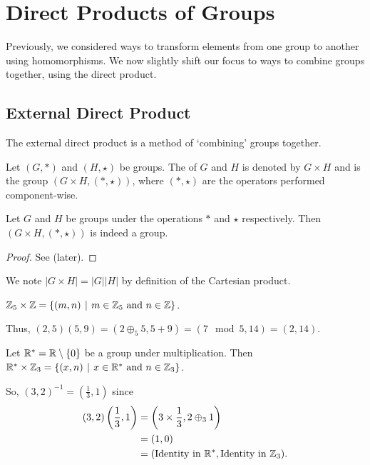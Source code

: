 \chapter{Direct Products of Groups}
Previously, we considered ways to transform elements from one group to another using homomorphisms. We now slightly shift our focus to ways to combine groups together, using the direct product.

\section{External Direct Product}
The external direct product is a method of `combining' groups together.

\begin{definition}
    Let $(G, \ast)$ and $(H, \star)$ be groups. The  of $G$ and $H$ is denoted by $G\times H$ and is the group $(G\times H, (\ast, \star))$, where $(\ast, \star)$ are the operators performed component-wise.
\end{definition}

\begin{proposition}\label{prop-external-direct-product-is-group}
    Let $G$ and $H$ be groups under the operations $\ast$ and $\star$ respectively. Then $(G \times H, (\ast, \star))$ is indeed a group.
\end{proposition}
\begin{proof}
    See  (later).
\end{proof}

We note $|G \times H| = |G||H|$ by definition of the Cartesian product.

\begin{example}
    $\Z_5 \times \Z = \{(m,n) \vert m \in \Z_5 \text{ and } n \in \Z\}$.

    Thus, $(2, 5)(5, 9) = (2 \oplus_5 5, 5 + 9) = (7 \mod 5, 14) = (2, 14)$.
\end{example}

\begin{example}
    Let $\mathbb{R}^\ast = \mathbb{R}\setminus\{0\}$ be a group under multiplication. Then $\R^\ast \times \Z_3 = \{ (x, n) \vert x \in \R^\ast \text{ and } n \in \Z_3\}$.

    So, $(3, 2)^{-1} = \left(\frac13, 1\right)$ since
    \begin{align*}
        (3, 2)\left(\frac13, 1\right) &= \left(3 \times \frac13, 2 \oplus_3 1\right)\\
        &= (1, 0)\\
        &= (\text{Identity in }\mathbb{R}^\ast, \text{Identity in }\mathbb{Z}_3).
    \end{align*}
\end{example}

